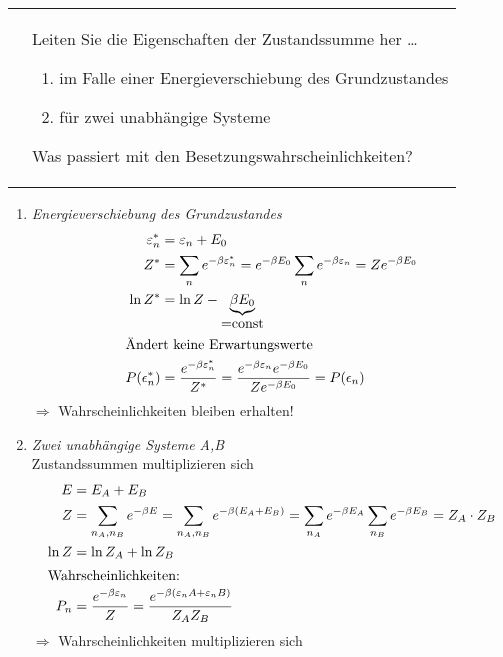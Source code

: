 \documentclass[a4paper,12pt]{scrartcl}
\makeatletter
\newcounter{qc}\setcounter{qc}{1}
\newenvironment{fshaded}{
\def\FrameCommand{\fcolorbox{framecolor}{shadecolor}}
\MakeFramed {\FrameRestore}}
{\endMakeFramed}
\def\frage#1{
\begin{fshaded}
\noindent
\begin{tabularx}{0.99\textwidth}{@{}c!{\color{framecolor}\vline}X}
{ \bf \rm \theqc }	&	\noindent #1
\end{tabularx}
\stepcounter{qc}
\end{fshaded}
}
\makeatother
\begin{document}
\frage{
Leiten Sie die Eigenschaften der Zustandssumme her \ldots{}
\begin{enumerate}
\item im Falle einer Energieverschiebung des Grundzustandes
\item für zwei unabhängige Systeme
\end{enumerate}
Was passiert mit den Besetzungswahrscheinlichkeiten?
}
\noindent
\begin{enumerate}
\item \textit{Energieverschiebung des Grundzustandes}
\begin{align*}
\varepsilon_n^*&=\varepsilon_n+E_0\\
Z^*&=\sum_n e^{-\beta \varepsilon_n^*}=e^{-\beta E_0}\sum_n e^{-\beta \varepsilon_n}= Ze^{-\beta E_0}\\
\ln{Z^*}&=\ln{Z}-\underbrace{\beta E_0}_{\mbox{=const}}\\
\intertext{Ändert keine Erwartungswerte}
P(\epsilon_n^*)&=\frac{e^{-\beta \varepsilon_n^*}}{Z^*}=\frac{e^{-\beta \varepsilon_n}e^{-\beta E_0}}{Ze^{-\beta 
E_0}}=P(\epsilon_n)
\end{align*}
$\Rightarrow$ Wahrscheinlichkeiten bleiben erhalten!
\item \textit{Zwei unabhängige Systeme A,B}\\
Zustandssummen multiplizieren sich
\begin{align*}
E&=E_A+E_B\\
Z&=\sum_{n_A,n_B}e^{-\beta E}=\sum_{n_A,n_B}e^{-\beta (E_A+E_B)}=\sum_{n_A}e^{-\beta E_A}\sum_{n_B}e^{-\beta E_B}=Z_A\cdot 
Z_B\\
\ln{Z}&=\ln{Z_A}+\ln{Z_B}\\
\intertext{Wahrscheinlichkeiten:}
P_n&=\frac{e^{-\beta \varepsilon_n}}{Z}=\frac{e^{-\beta (\varepsilon_n A+\varepsilon_n B)}}{Z_A Z_B}
\end{align*}
$\Rightarrow$ Wahrscheinlichkeiten multiplizieren sich
\end{enumerate}

\end{document}
